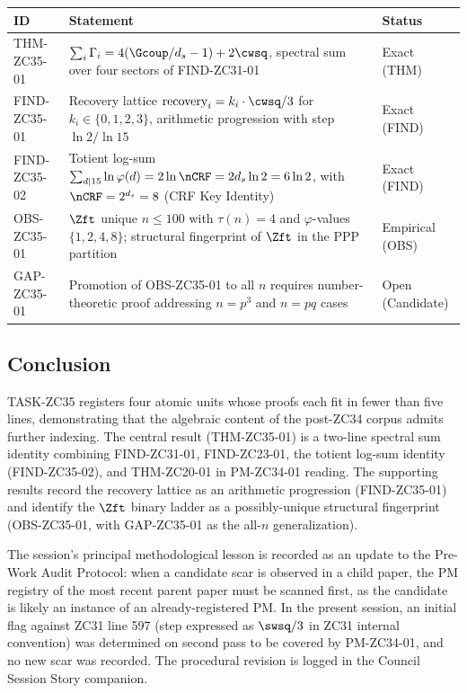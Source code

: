 \documentclass[12pt, a4paper]{article}
\begin{document}
\begin{longtable}{p{2.5cm} p{8.5cm} p{2.5cm}}
\toprule
\textbf{ID} & \textbf{Statement} & \textbf{Status}\\
\midrule
THM-ZC35-01 & $\sum_i \Gamma_i = 4(\Gcoup/d_s - 1) + 2\cwsq$,
  spectral sum over four sectors of FIND-ZC31-01 & Exact (THM)\\
\midrule
FIND-ZC35-01 & Recovery lattice
  $\text{recovery}_i = k_i \cdot \cwsq/3$ for $k_i \in \{0,1,2,3\}$,
  arithmetic progression with step $\ln 2/\ln 15$ & Exact (FIND)\\
\midrule
FIND-ZC35-02 & Totient log-sum
  $\sum_{d \mid 15} \ln \varphi(d) = 2 \ln \nCRF = 2 d_s \ln 2 = 6 \ln 2$,
  with $\nCRF = 2^{d_s} = 8$ (CRF Key Identity) & Exact (FIND)\\
\midrule
OBS-ZC35-01 & $\Zft$ unique $n \le 100$ with $\tau(n) = 4$ and
  $\varphi$-values $\{1,2,4,8\}$; structural fingerprint of $\Zft$ in
  the PPP partition & Empirical (OBS)\\
\midrule
GAP-ZC35-01 & Promotion of OBS-ZC35-01 to all $n$ requires
  number-theoretic proof addressing $n = p^3$ and $n = pq$ cases &
  Open (Candidate)\\
\bottomrule
\end{longtable}

\subsection{Conclusion}
\label{sec:conclusion}

TASK-ZC35 registers four atomic units whose proofs each fit in fewer
than five lines, demonstrating that the algebraic content of the
post-ZC34 corpus admits further indexing. The central result
(THM-ZC35-01) is a two-line spectral sum identity combining FIND-ZC31-01,
FIND-ZC23-01, the totient log-sum identity (FIND-ZC35-02), and
THM-ZC20-01 in PM-ZC34-01 reading. The supporting results record the
recovery lattice as an arithmetic progression (FIND-ZC35-01) and
identify the $\Zft$ binary ladder as a possibly-unique structural
fingerprint (OBS-ZC35-01, with GAP-ZC35-01 as the all-$n$ generalization).

The session's principal methodological lesson is recorded as an update
to the Pre-Work Audit Protocol: when a candidate scar is observed in a
child paper, the PM registry of the most recent parent paper must be
scanned first, as the candidate is likely an instance of an
already-registered PM. In the present session, an initial flag against
ZC31 line 597 (step expressed as $\swsq/3$ in ZC31 internal convention)
was determined on second pass to be covered by PM-ZC34-01, and no new
scar was recorded. The procedural revision is logged in the Council
Session Story companion.
\end{document}

